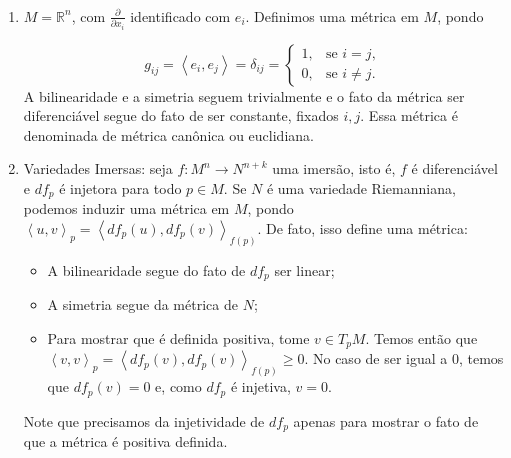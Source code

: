 
\begin{examples}
	$ $
	\label{ex:metricas-isometrias}
	\begin{enumerate}
		\item $M=\mathbb{R}^{n}$, com $\frac{\partial}{\partial x_{i}}$ identificado com $e_{i}$. Definimos uma métrica em  $M$, pondo

		      \begin{equation*}
			      g_{ij}=\left< e_{i}, e_{j} \right>= \delta_{ij}= \begin{cases} 1, & \text{se } i=j,\\ 0, & \text{se } i\neq j. \end{cases}
		      \end{equation*}
		      A bilinearidade e a simetria seguem trivialmente e o fato da métrica ser diferenciável segue do fato de ser constante, fixados $i,j$. Essa métrica é denominada de métrica canônica ou euclidiana.
		\item Variedades Imersas:
		      seja $f:M^{n}\to N^{n+k}$ uma imersão, isto é, $f$ é diferenciável e $df_{p}$ é injetora para todo $p \in M$.
		      Se $N$ é uma variedade Riemanniana, podemos induzir uma métrica em $M$, pondo $\left< u, v \right>_{p}=\left< df_{p}(u), df_{p}(v) \right>_{f(p)}$. De fato, isso define uma métrica:
		      \begin{itemize}
			      \item A bilinearidade segue do fato de $df_{p}$ ser linear;
			      \item A simetria segue da métrica de $N$;
			      \item Para mostrar que é definida positiva, tome $v \in T_{p}M$. Temos então que $\left< v, v \right>_{p}=\left< df_{p}(v), df_{p}(v) \right>_{f(p)}\geq0$. No caso de ser igual a $0$, temos que $df_{p}(v)=0$ e, como $df_{p}$ é injetiva, $v=0$.
		      \end{itemize}

		      Note que precisamos da injetividade de $df_{p}$ apenas para mostrar o fato de que a métrica é positiva definida.


\end{enumerate}
\end{examples}
